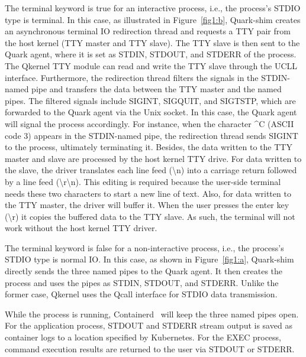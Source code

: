The terminal keyword is true for an interactive process, i.e., the process’s STDIO type is terminal. In this case, as illustrated in Figure~\ref{fig1:b}, Quark-shim creates an asynchronous terminal IO redirection thread and requests a TTY pair from the host kernel (TTY master and TTY slave). The TTY 
slave is then sent to the Quark agent, where it is set as STDIN, STDOUT, and STDERR of the process. The Qkernel TTY module can read and write the TTY slave through the UCLL interface. Furthermore, the redirection thread  filters the signals in the STDIN-named pipe and 
transfers the data between the TTY master and the named pipes. The filtered signals include SIGINT, SIGQUIT, and SIGTSTP, which are forwarded to the Quark agent via the Unix socket. In this case, the Quark agent will signal the process accordingly. For instance, when the character \textasciicircum C (ASCII code 3) appears in 
the STDIN-named pipe, the redirection thread sends SIGINT to the process, ultimately terminating it. Besides, the data written to the TTY master and slave are processed by the host kernel TTY drive. For data written to the slave, the driver translates each line feed (\textbackslash n) into a carriage return
 followed by a line feed (\textbackslash r\textbackslash n). This editing is required because the user-side terminal needs these two characters to start a new line of text. Also, for data written to the TTY master, the driver will buffer it. When the user presses the enter key (\textbackslash r) it 
 copies the buffered data to the TTY slave. As such, the terminal will not work without the host kernel TTY driver.

The terminal keyword is false for a non-interactive process, i.e., the process’s STDIO type is normal IO. In this case, as shown in Figure~\ref{fig1:a}, Quark-shim directly sends the three named pipes to the Quark agent. It then creates the process and uses the pipes as STDIN, STDOUT, and STDERR. 
Unlike the former case, Qkernel uses the Qcall interface for STDIO data transmission.

While the process is running, Containerd~\cite*{containerd} will keep the three named pipes open. For the application process, STDOUT and STDERR stream output is saved as container logs to a location specified by Kubernetes. For the EXEC process, command execution results are returned to the user via 
STDOUT or STDERR.


